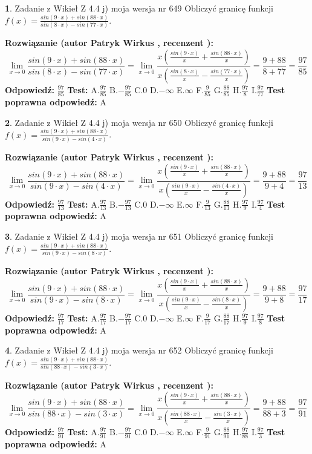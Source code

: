 \documentclass[12pt, a4paper]{article}
\theoremstyle{definition} %
\newtheorem{zad}{}
\newcommand{\zadStart}[1]{\begin{zad}#1\newline}
\newcommand{\zadStop}{\end{zad}}
\newcommand{\rozwStart}[2]{\noindent \textbf{Rozwiązanie (autor #1 , recenzent #2): }\newline}
\newcommand{\rozwStop}{\newline}
\newcommand{\odpStart}{\noindent \textbf{Odpowiedź:}\newline}
\newcommand{\odpStop}{\newline}
\newcommand{\testStart}{\noindent \textbf{Test:}\newline}
\newcommand{\testStop}{\newline}
\newcommand{\kluczStart}{\noindent \textbf{Test poprawna odpowiedź:}\newline}
\newcommand{\kluczStop}{\newline}
\begin{document}
\zadStart{Zadanie z Wikieł Z 4.4 j) moja wersja nr 649}
Obliczyć granicę funkcji $f(x)=\frac{sin(9\cdot x) +sin(88\cdot x)}{sin(8\cdot x) -sin(77\cdot x)}$.
\zadStop
\rozwStart{Patryk Wirkus}{}
$$\lim\limits_{x\to 0}\frac{sin(9\cdot x) +sin(88\cdot x)}{sin(8\cdot x) -sin(77\cdot x)}=\lim\limits_{x\to 0}\frac{x(\frac{sin(9\cdot x)}{x}+\frac{sin(88\cdot x)}{x})}{x(\frac{sin(8\cdot x)}{x}-\frac{sin(77\cdot x)}{x})}=\frac{9+88}{8+77} = \frac{97}{85}$$
\rozwStop
\odpStart
$\frac{97}{85}$
\odpStop
\testStart
A.$\frac{97}{85}$
B.$-\frac{97}{85}$
C.$0$
D.$-\infty$
E.$\infty$
F.$\frac{9}{85}$
G.$\frac{88}{85}$
H.$\frac{97}{8}$
I.$\frac{97}{77}$
\testStop
\kluczStart
A
\kluczStop



\zadStart{Zadanie z Wikieł Z 4.4 j) moja wersja nr 650}
Obliczyć granicę funkcji $f(x)=\frac{sin(9\cdot x) +sin(88\cdot x)}{sin(9\cdot x) -sin(4\cdot x)}$.
\zadStop
\rozwStart{Patryk Wirkus}{}
$$\lim\limits_{x\to 0}\frac{sin(9\cdot x) +sin(88\cdot x)}{sin(9\cdot x) -sin(4\cdot x)}=\lim\limits_{x\to 0}\frac{x(\frac{sin(9\cdot x)}{x}+\frac{sin(88\cdot x)}{x})}{x(\frac{sin(9\cdot x)}{x}-\frac{sin(4\cdot x)}{x})}=\frac{9+88}{9+4} = \frac{97}{13}$$
\rozwStop
\odpStart
$\frac{97}{13}$
\odpStop
\testStart
A.$\frac{97}{13}$
B.$-\frac{97}{13}$
C.$0$
D.$-\infty$
E.$\infty$
F.$\frac{9}{13}$
G.$\frac{88}{13}$
H.$\frac{97}{9}$
I.$\frac{97}{4}$
\testStop
\kluczStart
A
\kluczStop



\zadStart{Zadanie z Wikieł Z 4.4 j) moja wersja nr 651}
Obliczyć granicę funkcji $f(x)=\frac{sin(9\cdot x) +sin(88\cdot x)}{sin(9\cdot x) -sin(8\cdot x)}$.
\zadStop
\rozwStart{Patryk Wirkus}{}
$$\lim\limits_{x\to 0}\frac{sin(9\cdot x) +sin(88\cdot x)}{sin(9\cdot x) -sin(8\cdot x)}=\lim\limits_{x\to 0}\frac{x(\frac{sin(9\cdot x)}{x}+\frac{sin(88\cdot x)}{x})}{x(\frac{sin(9\cdot x)}{x}-\frac{sin(8\cdot x)}{x})}=\frac{9+88}{9+8} = \frac{97}{17}$$
\rozwStop
\odpStart
$\frac{97}{17}$
\odpStop
\testStart
A.$\frac{97}{17}$
B.$-\frac{97}{17}$
C.$0$
D.$-\infty$
E.$\infty$
F.$\frac{9}{17}$
G.$\frac{88}{17}$
H.$\frac{97}{9}$
I.$\frac{97}{8}$
\testStop
\kluczStart
A
\kluczStop



\zadStart{Zadanie z Wikieł Z 4.4 j) moja wersja nr 652}
Obliczyć granicę funkcji $f(x)=\frac{sin(9\cdot x) +sin(88\cdot x)}{sin(88\cdot x) -sin(3\cdot x)}$.
\zadStop
\rozwStart{Patryk Wirkus}{}
$$\lim\limits_{x\to 0}\frac{sin(9\cdot x) +sin(88\cdot x)}{sin(88\cdot x) -sin(3\cdot x)}=\lim\limits_{x\to 0}\frac{x(\frac{sin(9\cdot x)}{x}+\frac{sin(88\cdot x)}{x})}{x(\frac{sin(88\cdot x)}{x}-\frac{sin(3\cdot x)}{x})}=\frac{9+88}{88+3} = \frac{97}{91}$$
\rozwStop
\odpStart
$\frac{97}{91}$
\odpStop
\testStart
A.$\frac{97}{91}$
B.$-\frac{97}{91}$
C.$0$
D.$-\infty$
E.$\infty$
F.$\frac{9}{91}$
G.$\frac{88}{91}$
H.$\frac{97}{88}$
I.$\frac{97}{3}$
\testStop
\kluczStart
A
\kluczStop
\end{document}
